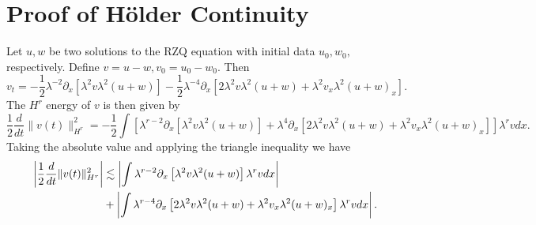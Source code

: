 \documentclass[reqno]{amsart}
\theoremstyle{plain}
\numberwithin{equation}{section}
\begin{document}
\section{Proof of H\"older Continuity}
Let $u,w$ be two solutions to the RZQ equation with initial data $u_0,w_0,$ respectively. 
Define $v = u-w, v_0 = u_0 - w_0.$ 
Then  
    \[v_t =  -\frac12\lambda^{-2}\partial_x\left[\lambda^2v\lambda^2(u+w)\right] - \frac12\lambda^{-4}\partial_x\left[2\lambda^2v\lambda^2(u+w) + \lambda^2v_x\lambda^2(u+w)_x\right].\] 
The $H^r$ energy of $v$ is then given by
    \[\frac12 \frac{d}{dt} \|v(t)\|_{H^r}^2 = 
        - \frac12\int \left[\lambda^{r-2}\partial_x\left[\lambda^2v\lambda^2(u+w)\right] + \lambda^4\partial_x\left[2\lambda^2v\lambda^2(u+w) + \lambda^2v_x\lambda^2(u+w)_x\right]\right]\lambda^{r}vdx.\]
\noindent Taking the absolute value and applying the triangle inequality we have 
 \begin{align} 
  \notag  \left|\frac12 \frac{d}{dt} \|v(t)\|_{H^r}^2 \right| 
        &\lesssim \left| \int \lambda^{r-2}\partial_x\left[\lambda^2v\lambda^2(u+w)\right] \lambda^{r}vdx\right|
        \\ &+ \left| \int \lambda^{r-4}\partial_x\left[2\lambda^2v\lambda^2(u+w) + \lambda^2v_x\lambda^2(u+w)_x\right] \lambda^{r}vdx\right|. 
         \label{energy}
\end{align}
 
\end{document}

